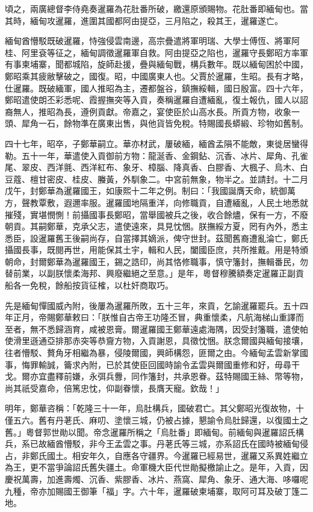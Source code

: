 \begin{pinyinscope}
頃之，兩廣總督李侍堯奏暹羅為花肚番所破，繳還原頒賜物。花肚番即緬甸也。當其時，緬甸攻暹羅，進圍其國都阿由提亞，三月陷之，殺其王，暹羅遂亡。

緬甸酋懵駁既破暹羅，恃強侵雲南邊，高宗疊遣將軍明瑞、大學士傅恆、將軍阿桂、阿里袞等征之，緬甸調徵暹羅軍自救。阿由提亞之陷也，暹羅守長鄭昭方率軍有事柬埔寨，聞都城陷，旋師赴援，疊與緬甸戰，構兵數年。既以緬甸困於中國，鄭昭乘其疲敝擊破之，國復。昭，中國廣東人也。父賈於暹羅，生昭。長有才略，仕暹羅。既破緬軍，國人推昭為主，遷都盤谷，鎮撫綏輯，國日殷富。四十六年，鄭昭遣使朗丕彩悉呢、霞握撫突等入貢，奏稱暹羅自遭緬亂，復土報仇，國人以詔裔無人，推昭為長，遵例貢獻。帝嘉之，宴使臣於山高水長。所貢方物，收象一頭、犀角一石，餘物準在廣東出售，與他貨皆免稅。特賜國長蟒緞、珍物如舊制。

四十七年，昭卒，子鄭華嗣立。華亦材武，屢破緬，緬酋孟隕不能敵，東徙居蠻得勒。五十一年，華遣使入貢御前方物：龍涎香、金鋼鉆、沉香、冰片、犀角、孔雀尾、翠皮、西洋氈、西洋紅布、象牙、樟腦、降真香、白膠香、大楓子、烏木、白豆蔻、檀甘密皮、桂皮、螣黃，外馴象二。中宮前無象，物半之。並請封。十二月戊午，封鄭華為暹羅國王，如康熙十二年之例。制曰：「我國誕膺天命，統御萬方，聲教覃敷，遐邇率服。暹羅國地隔重洋，向修職貢，自遭緬亂，人民土地悉就摧殘，實堪憫惻！前攝國事長鄭昭，當舉國被兵之後，收合餘燼，保有一方，不廢朝貢。其嗣鄭華，克承父志，遣使遠來，具見忱悃。朕撫綏方夏，罔有內外，悉主悉臣，設暹羅舊王後嗣尚存，自當擇其嫡派，俾守世封。茲聞舊裔遭亂淪亡，鄭氏攝國長事，既閱再世，用能保其土宇，輯和人民，闔國臣庶，共所推戴。用是特頒朝命，封爾鄭華為暹羅國王，錫之誥印，尚其恪修職事，慎守籓封，撫輯番民，勿替前業，以副朕懷柔海邦、興廢繼絕之至意。」是年，粵督穆騰額奏定暹羅正副貢船各一免稅，餘船按貨征榷，以杜奸商取巧。

先是緬甸憚國威內附，後屢為暹羅所敗，五十三年，來貢，乞諭暹羅罷兵。五十四年正月，帝賜鄭華敕曰：「朕惟自古帝王功隆丕冒，典重懷柔，凡航海梯山重譯而至者，無不悉歸涵育，咸被恩膏。爾暹羅國王鄭華遠處海隅，因受封籓職，遣使帕使滑里遜通亞排那赤突等恭齎方物，入貢謝恩，具徵忱悃。朕念爾國與緬甸接壤，往者懵駁、贅角牙相繼為暴，侵陵爾國，興師構怨，匪爾之由。今緬甸孟雲新掌國事，悔罪輸誠，籥求內附，已於其使臣回國時諭令孟雲與爾國重修和好，毋尋干戈。爾亦宜盡釋前嫌，永弭兵釁，同作籓封，共承恩眷。茲特賜國王絲、幣等物，尚其祇受嘉命，倍篤忠忱，仰副眷懷，長膺天寵。欽哉！」

明年，鄭華咨稱：「乾隆三十一年，烏肚構兵，國破君亡。其父鄭昭光復故物，十僅五六。舊有丹荖氏、麻叨、塗懷三城，仍被占據，懇諭令烏肚歸還，以復國土之舊。」粵督郭世勛以聞。帝念暹羅所稱之「烏肚番」即緬甸。前緬甸與暹羅詔氏構兵，系已故緬酋懵駁，非今王孟雲之事。丹荖氏等三城，亦系詔氏在國時被緬甸侵占，非鄭氏國土。相安年久，自應各守疆界。今暹羅已經易世，暹羅又系異姓繼立為王，更不當爭論詔氏舊失疆土。命軍機大臣代世勛擬檄諭止之。是年，入貢，因慶祝萬壽，加進壽燭、沉香、紫膠香、冰片、燕窩、犀角、象牙、通大海、哆囉呢九種，帝亦加賜國王御筆「福」字。六十年，暹羅破柬埔寨，取阿可耳及破丁篷二地。


\end{pinyinscope}
